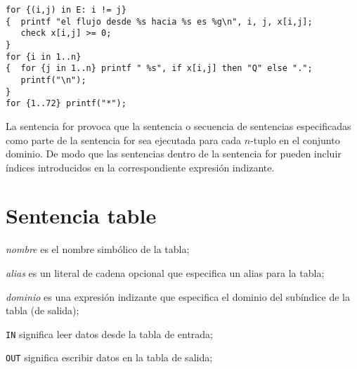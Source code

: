 \documentclass[11pt,spanish]{report}
\def\para#1{\noindent{\bf#1}}
\begin{document}
\para{Ejemplos}

\begin{verbatim}
for {(i,j) in E: i != j}
{  printf "el flujo desde %s hacia %s es %g\n", i, j, x[i,j];
   check x[i,j] >= 0;
}
for {i in 1..n}
{  for {j in 1..n} printf " %s", if x[i,j] then "Q" else ".";
   printf("\n");
}
for {1..72} printf("*");
\end{verbatim}

La sentencia for provoca que la sentencia o secuencia de sentencias especificadas como parte de la sentencia for sea ejecutada para cada $n$-tuplo en el conjunto dominio. De modo que las sentencias dentro de la sentencia for pueden incluir índices introducidos en la correspondiente expresión indizante.

\section{Sentencia table}

\noindent
{}

\medskip

\noindent
{\it nombre} es el nombre simbólico de la tabla;

\noindent
{\it alias} es un literal de cadena opcional que especifica un alias para la tabla;

\noindent
{\it dominio} es una expresión indizante que especifica el dominio del subíndice de la tabla (de salida);

\noindent
{\tt IN} significa leer datos desde la tabla de entrada;

\noindent
{\tt OUT} significa escribir datos en la tabla de salida;
\end{document}
